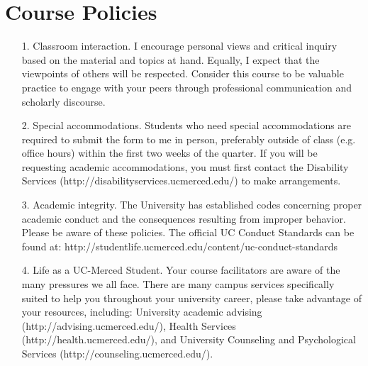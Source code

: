 \documentclass{article}
\begin{document}
{\section*{Course Policies}
\begin{itemize}
 \item[1.] Classroom interaction. I encourage personal views and critical inquiry based on the material and topics at hand. Equally, I expect that the viewpoints of others will be respected. Consider this course to be valuable practice to engage with your peers through professional communication and scholarly discourse. 
 \item[2.] Special accommodations. Students who need special accommodations are required to submit the form to me in person, preferably outside of class (e.g. office hours) within the first two weeks of the quarter. If you will be requesting academic accommodations, you must first contact the Disability Services (http://disabilityservices.ucmerced.edu/) to make arrangements.
\item[3.] Academic integrity. The University has established codes concerning proper academic conduct and the consequences resulting from improper behavior. 
Please be aware of these policies. The official UC Conduct Standards can be found at: http://studentlife.ucmerced.edu/content/uc-conduct-standards
\item[4.] Life as a UC-Merced Student. Your course facilitators are aware of the many pressures we all face. There are many campus services specifically suited to help you throughout your university career, please take advantage of your resources, including: University academic advising (http://advising.ucmerced.edu/), Health Services (http://health.ucmerced.edu/), and University Counseling and Psychological Services (http://counseling.ucmerced.edu/).
\end{itemize}

}
\end{document}
